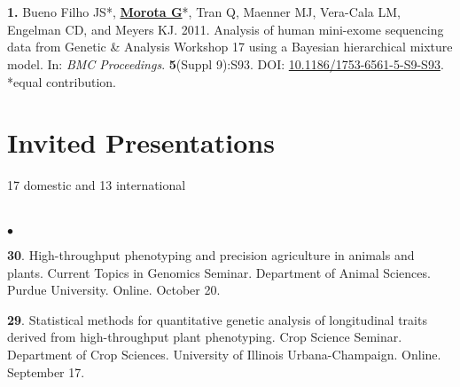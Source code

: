 \documentclass[margin,line,10pt]{res}
\newenvironment{list1}{
  \begin{list}{\ding{113}}{%
      \setlength{\itemsep}{0in}
      \setlength{\parsep}{0in} \setlength{\parskip}{0in}
      \setlength{\topsep}{0in} \setlength{\partopsep}{0in} 
      \setlength{\leftmargin}{0.17in}}}{\end{list}}
\newenvironment{list2}{
  \begin{list}{$\bullet$}{%
      \setlength{\itemsep}{0in}
      \setlength{\parsep}{0in} \setlength{\parskip}{0in}
      \setlength{\topsep}{0in} \setlength{\partopsep}{0in} 
      \setlength{\leftmargin}{0.2in}}}{\end{list}}
\begin{document}
\begin{resume}
\section{}
\begin{list1}
\item [\bf{1}.] Bueno Filho JS*, {\bf \underline{Morota G}}*, Tran Q, Maenner MJ, Vera-Cala LM, Engelman CD, and Meyers KJ. 2011. Analysis of human mini-exome sequencing data from Genetic \& Analysis Workshop 17 using a  Bayesian hierarchical mixture model. In: \emph{BMC Proceedings}. {\bf 5}(Suppl 9):S93. DOI: \textcolor{blue}{\href{http://dx.doi.org/10.1186/1753-6561-5-S9-S93}{10.1186/1753-6561-5-S9-S93}}. *equal contribution.   
\end{list1}








\vspace{0.5cm}
\section{\sc Invited Presentations}
\vspace{0.5cm}
17 domestic and 13 international \\
\noindent

\section{}
\begin{list2}

  \item [{\bf 30}.] High-throughput phenotyping and precision agriculture in animals and plants. Current Topics in Genomics Seminar. Department of Animal Sciences. Purdue University. Online. October 20.

     \vspace{0.5cm}

 \item [{\bf 29}.] Statistical methods for quantitative genetic analysis of longitudinal traits derived from high-throughput plant phenotyping. Crop Science Seminar. Department of Crop Sciences. University of Illinois Urbana-Champaign. Online. September 17. 


\end{list2}
\end{resume}
\end{document}
